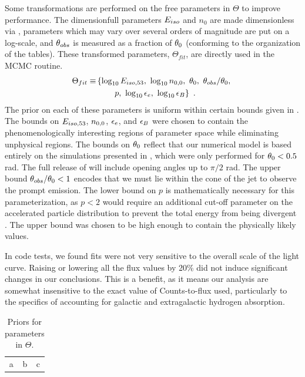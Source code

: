 Some transformations are performed on the free parameters in $\Theta$ to improve performance.  The dimensionfull parameters $E_{iso}$ and $n_0$ are made dimensionless via , parameters which may vary over several orders of magnitude are put on a log-scale, and $\theta_{obs}$ is measured as a fraction of $\theta_0$ (conforming to the organization of the tables).  These transformed parameters, $\Theta_{fit}$, are directly used in the MCMC routine.
\begin{align}
    \Theta_{fit} \equiv& \left \{  \log_{10} E_{iso, 53}, \ \log_{10} n_{0, 0}, \ \theta_0, \ \theta_{obs}  / \theta_0, \right . \nonumber \\
    &\qquad \left . p, \ \log_{10} \epsilon_e, \ \log_{10} \epsilon_B \right \} \ .
\end{align}
The prior on each of these parameters is uniform within certain bounds given in .  The bounds on $E_{iso, 53}$, $n_{0, 0}$, $\epsilon_e$, and $\epsilon_B$ were chosen to contain the phenomenologically interesting regions of parameter space while eliminating unphysical regions.  The bounds on $\theta_0$ reflect that our numerical model is based entirely on the simulations presented in \cite{vanEer12boxfit}, which were only performed for $\theta_0 < 0.5$ rad. The full release of \scalefit{} will include opening angles up to $\pi/2$ rad.  The upper bound $\theta_{obs}/\theta_0<1$ encodes that we must lie within the cone of the jet to observe the prompt emission.  The lower bound on $p$ is mathematically necessary for this parameterization, as $p<2$ would require an additional cut-off parameter on the accelerated particle distribution to prevent the total energy from being divergent \citep[see e.g. discussions in][]{Granot02, vanEer13review}. The upper bound was chosen to be high enough to contain the physically likely values.

In code tests, we found fits were not very sensitive to the overall scale of the light curve.  Raising or lowering all the flux values by 20\% did not induce significant changes in our conclusions.  This is a benefit, as it means our analysis are somewhat insensitive to the exact value of Counts-to-flux used, particularly to the specifics of accounting for galactic and extragalactic hydrogen absorption.

\begin{table}
\begin{center}
\begin{tabular}{ccc}
a & b & c
\end{tabular}
\end{center}
\caption{Priors for parameters in $\Theta$. }
\end{table}

